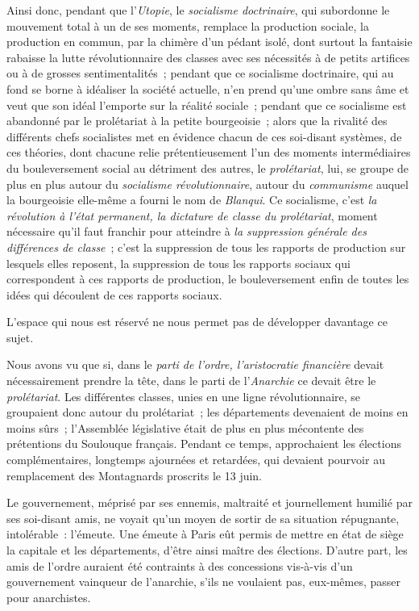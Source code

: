 \documentclass[french,twoside]{book} %
\begin{document}
Ainsi donc, pendant que l’\emph{Utopie}, le \emph{socialisme doctrinaire}, qui subordonne le mouvement total à un de ses moments, remplace la production sociale, la production en commun, par la chimère d’un pédant isolé, dont surtout la fantaisie rabaisse la lutte révolutionnaire des classes avec ses nécessités à de petits artifices ou à de grosses sentimentalités ; pendant que ce socialisme doctrinaire, qui au fond se borne à idéaliser la société actuelle, n’en prend qu’une ombre sans âme et veut que son idéal l’emporte sur la réalité sociale ; pendant que ce socialisme est abandonné par le prolétariat à la petite bourgeoisie ; alors que la rivalité des différents chefs socialistes met en évidence chacun de ces soi-disant systèmes, de ces théories, dont chacune relie prétentieusement l’un des moments intermédiaires du bouleversement social au détriment des autres, le \emph{prolétariat}, lui, se groupe de plus en plus autour du \emph{socialisme révolutionnaire}, autour du \emph{communisme} auquel la bourgeoisie elle-même a fourni le nom de \emph{Blanqui}. Ce socialisme, c’est \emph{la révolution à l’état permanent, la dictature de classe du prolétariat}, moment nécessaire qu’il faut franchir pour atteindre à \emph{la suppression générale des différences de classe} ; c’est la suppression de tous les rapports de production sur lesquels elles reposent, la suppression de tous les rapports sociaux qui correspondent à ces rapports de production, le bouleversement enfin de toutes les idées qui découlent de ces rapports sociaux.\par
L’espace qui nous est réservé ne nous permet pas de développer davantage ce sujet.\par
Nous avons vu que si, dans le \emph{parti de l’ordre, l’aristocratie financière} devait nécessairement prendre la tête, dans le parti de l’\emph{Anarchie} ce devait être le \emph{prolétariat}. Les différentes classes, unies en une ligne révolutionnaire, se groupaient donc autour du prolétariat ; les départements devenaient de moins en moins sûrs ; l’Assemblée législative était de plus en plus mécontente des prétentions du Soulouque français. Pendant ce temps, approchaient les élections complémentaires, longtemps ajournées et retardées, qui devaient pourvoir au remplacement des Montagnards proscrits le 13 juin.\par
Le gouvernement, méprisé par ses ennemis, maltraité et journellement humilié par ses soi-disant amis, ne voyait qu’un moyen de sortir de sa situation répugnante, intolérable : l’émeute. Une émeute à Paris eût permis de mettre en état de siège la capitale et les départements, d’être ainsi maître des élections. D’autre part, les amis de l’ordre auraient été contraints à des concessions vis-à-vis d’un gouvernement vainqueur de l’anarchie, s’ils ne voulaient pas, eux-mêmes, passer pour anarchistes.\par
\end{document}
